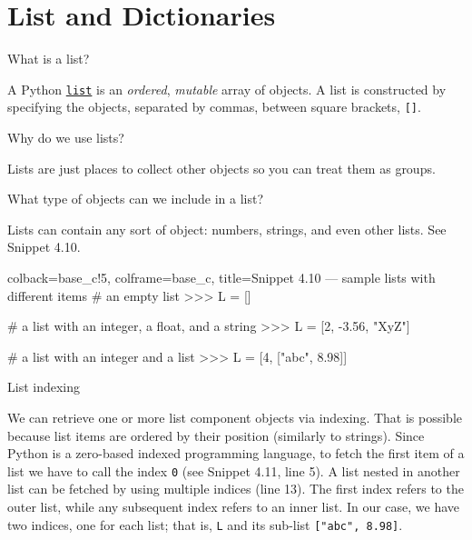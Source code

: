 \documentclass[a4paper,11pt]{book}
\numberwithin{figure}{chapter}
\numberwithin{table}{chapter}
\newcommand{\question}[1]{%
    \begin{tcolorbox}[colback=comp_c!10,colframe=comp_c,sidebyside align=top,width=\linewidth,before skip=1ex]
        #1
    \end{tcolorbox}%
    \switchcolumn%
}
\newcommand{\note}[1]{%
    \begin{tcolorbox}[colback=white!0,colframe=white!10,width=\linewidth,before skip=1ex]
        #1
    \end{tcolorbox}         
}
\begin{document}
\section{List and Dictionaries}

\begin{paracol}{2}
	\question{\raggedright What is a list?}
		\note{A Python \href{https://docs.python.org/3/tutorial/datastructures.html}{\texttt{list}} is an \emph{ordered}, \emph{mutable} array of objects. A list is constructed by specifying the objects, separated by commas, between square brackets, \texttt{[]}.}
\end{paracol}

\begin{paracol}{2}
	\question{\raggedright Why do we use lists?}
	\note{Lists are just places to collect other objects so you can treat them as groups.}
\end{paracol}

\begin{paracol}{2}
	\question{\raggedright What type of objects can we include in a list?}
	\note{Lists can contain any sort of object: numbers, strings, and even other lists. See Snippet 4.10.}
\end{paracol}
\clearpage

\begin{pythoncode}[linenos=true,]{colback=base_c!5, colframe=base_c, title=\sffamily Snippet 4.10 --- sample lists with different items}
# an empty list
>>> L = [] 

# a list with an integer, a float, and a string
>>> L = [2, -3.56, "XyZ"]

# a list with an integer and a list
>>> L = [4, ["abc", 8.98]]

\end{pythoncode}

\begin{paracol}{2}
	\question{\raggedright List indexing}
	\note{We can retrieve one or more list component objects via indexing. That is possible because list items are ordered by their position  (similarly to strings). Since Python is a zero-based indexed programming language, to fetch the first item of a list we have to call the index \texttt{0} (see Snippet 4.11, line 5). A list nested in another list can be fetched by using multiple indices (line 13). The first index refers to the outer list, while any subsequent index refers to an inner list. In our case, we have two indices, one for each list; that is, \texttt{L} and its sub-list \texttt{["abc", 8.98]}.}
\end{paracol}
\end{document}
